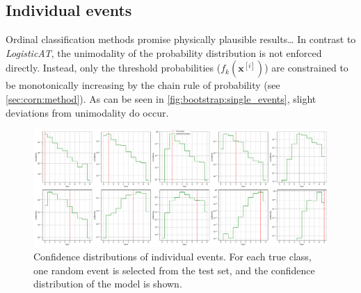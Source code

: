 \subsection{Individual events}
Ordinal classification methods promise physically plausible results… %
In contrast to \emph{LogisticAT},
  the unimodality of the probability distribution is not enforced directly.
Instead,
  only the threshold probabilities ($f_k(\mathbf{x}^{[i]})$) are constrained to be monotonically increasing
  by the chain rule of probability
  (see \autoref{sec:corn:method}).
As can be seen in \autoref{fig:bootstrap:single_events},
  slight deviations from unimodality do occur.


\begin{figure}
  \centering
  \includegraphics[width=\textwidth]{content/plots/halftime/single_events.pdf}
  \caption{
    Confidence distributions of individual events.
    For each true class,
    one random event is selected from the test set,
    and the confidence distribution of the model is shown.
  }
  \label{fig:bootstrap:single_events}
\end{figure}
